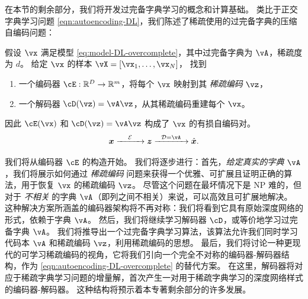 \documentclass[../../book-main_zh.tex]{subfiles}
\begin{document}
在本节的剩余部分，我们将开发过完备字典学习的概念和计算基础。
类比于正交字典学习问题 \eqref{eqn:autoencoding-DL}，我们陈述了稀疏使用的过完备字典的压缩自编码问题：
\begin{tcolorbox}
    假设 $\vx$ 满足模型 \eqref{eq:model-DL-overcomplete}，其中过完备字典为 $\vA$，稀疏度为 $d$。
    给定 $\vx$ 的样本 $\vX = [\vx_1, \dots, \vx_N]$，
    找到
    \begin{enumerate}[left=0pt, label=\arabic*.]
        \item 一个编码器 $\cE : \R^D \to \R^m$，将每个 $\vx$ 映射到其 \textit{稀疏编码} $\vz$，
        \item 一个解码器 $\cD(\vz) = \vA \vz$，从其稀疏编码重建每个 $\vx$。
    \end{enumerate}
    因此
    $\cE(\vx)$ 和 $\cD(\vz) = \vA \vz$ 构成了 $\vx$ 的有损自编码对。
\begin{equation}
\x \xrightarrow{\hspace{4mm} \mathcal{E} \hspace{4mm}}  \z \xrightarrow{\hspace{2mm} \mathcal{D} = \vA \hspace{2mm}}   \hat{\x}.  
\label{eqn:autoencoding-DL-overcomplete}
\end{equation}    
\end{tcolorbox}
我们将从编码器 $\cE$ 的构造开始。
我们将逐步进行：首先，\textit{给定真实的字典 $\vA$}，我们将展示如何通过 \textit{稀疏编码} 问题来获得一个优雅、可扩展且证明正确的算法，用于恢复 $\vx$ 的稀疏编码 $\vz$。
尽管这个问题在最坏情况下是 NP 难的，但对于 \textit{不相关} 的字典 $\vA$（即列之间不相关）来说，可以高效且可扩展地解决。
这种解决方案所涵盖的编码器架构将不再对称：我们将看到它具有原始深度网络的形式，依赖于字典 $\vA$。
然后，我们将继续学习解码器 $\cD$，或等价地学习过完备字典 $\vA$。
我们将推导出一个过完备字典学习算法，该算法允许我们同时学习代码本 $\vA$ 和稀疏编码 $\vz$，利用稀疏编码的思想。
最后，我们将讨论一种更现代的可学习稀疏编码的视角，它将我们引向一个完全不对称的编码器-解码器结构，作为 \eqref{eqn:autoencoding-DL-overcomplete} 的替代方案。
在这里，解码器将对应于稀疏字典学习问题的增量解，首次产生一对用于稀疏字典学习的深度网络样式的编码器-解码器。
这种结构将预示着本专著剩余部分的许多发展。

\end{document}
